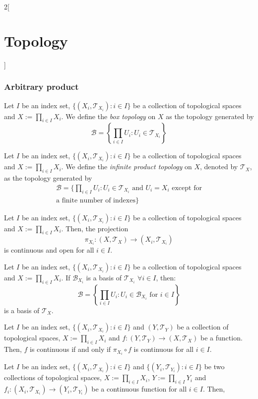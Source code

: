 \documentclass[../../../main.tex]{subfiles}
\begin{document}
\begin{multicols}{2}[\section{Topology}]
  \subsubsection{Arbitrary product}
  \begin{definition}
    Let $I$ be an index set, $\{(X_i,\mathcal{T}_{X_i}):i\in I\}$ be a collection of topological spaces and $X:=\prod_{i\in I}X_i$. We define the \textit{box topology} on $X$ as the topology generated by $$\mathcal{B}=\left\{\prod_{i\in I}U_i:U_i\in\mathcal{T}_{X_i}\right\}$$
  \end{definition}
  \begin{definition}
    Let $I$ be an index set, $\{(X_i,\mathcal{T}_{X_i}):i\in I\}$ be a collection of topological spaces and $X:=\prod_{i\in I}X_i$. We define the \textit{infinite product topology} on $X$, denoted by $\mathcal{T}_X$, as the topology generated by
    \begin{multline*}
      \mathcal{B}=\Bigg\{\prod_{i\in I}U_i:U_i\in\mathcal{T}_{X_i}\text{ and $U_i=X_i$ except for}\\\text{a finite number of indexes}\Bigg\}
    \end{multline*}
  \end{definition}
  \begin{prop}
    Let $I$ be an index set, $\{(X_i,\mathcal{T}_{X_i}):i\in I\}$ be a collection of topological spaces and $X:=\prod_{i\in I}X_i$. Then, the projection $$\pi_{X_i}:\left(X,\mathcal{T}_X\right)\longrightarrow (X_i,\mathcal{T}_{X_i})$$
    is continuous and open for all $i\in I$.
  \end{prop}
  \begin{prop}
    Let $I$ be an index set, $\{(X_i,\mathcal{T}_{X_i}):i\in I\}$ be a collection of topological spaces and $X:=\prod_{i\in I}X_i$. If $\mathcal{B}_{X_i}$ is a basis of $\mathcal{T}_{X_i}$ $\forall i\in I$, then: $$\mathcal{B}=\left\{\prod_{i\in I}U_i:U_i\in\mathcal{B}_{X_i}\text{ for }i\in I\right\}$$
    is a basis of $\mathcal{T}_X$.
  \end{prop}
  \begin{prop}
    Let $I$ be an index set, $\{(X_i,\mathcal{T}_{X_i}):i\in I\}$ and $(Y,\mathcal{T}_Y)$ be a collection of topological spaces, $X:=\prod_{i\in I}X_i$ and $f:(Y,\mathcal{T}_Y)\rightarrow(X,\mathcal{T}_X)$ be a function. Then, $f$ is continuous if and only if $\pi_{X_i}\circ f$ is continuous for all $i\in I$.
  \end{prop}
  \begin{prop}
    Let $I$ be an index set, $\{(X_i,\mathcal{T}_{X_i}):i\in I\}$ and $\{(Y_i,\mathcal{T}_{Y_i}):i\in I\}$ be two collections of topological spaces, $X:=\prod_{i\in I}X_i$, $Y:=\prod_{i\in I}Y_i$ and $f_i:(X_i,\mathcal{T}_{X_i})\rightarrow(Y_i,\mathcal{T}_{Y_i})$ be a continuous function for all $i\in I$. Then,

\end{prop}
\end{multicols}
\end{document}
